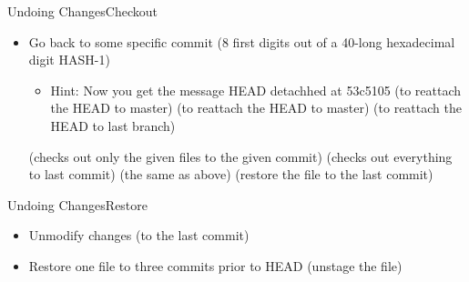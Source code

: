 \begin{frame}{Undoing Changes}{Checkout}
\begin{itemize}
\item Go back to some specific commit
 (8 first digits out of a 40-long hexadecimal digit HASH-1)
\begin{itemize}
\item Hint: Now you get the message {\color{red} HEAD detachhed at 53c5105}
   (to reattach the HEAD to master)
   (to reattach the HEAD to master)
   (to reattach the HEAD to last branch)
\end{itemize}
   (checks out only the given files to the given commit)
   (checks out everything to last commit)
   (the same as above)
   (restore the file to the last commit)
\end{itemize}
\end{frame}

\begin{frame}{Undoing Changes}{Restore}
\begin{itemize}
  \item Unmodify changes (to the last commit)
  \item Restore one file to three commits prior to HEAD
     (unstage the file)
\end{itemize}
\end{frame}
